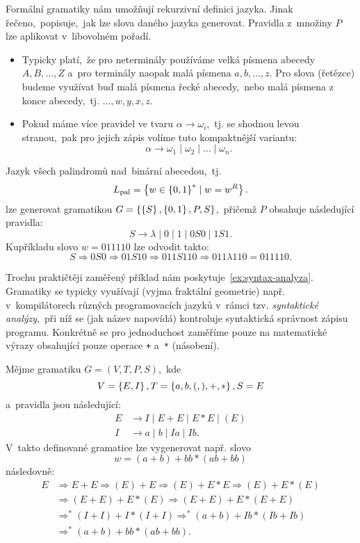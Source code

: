 Formální gramatiky nám umožňují rekurzivní definici jazyka. Jinak řečeno,~popisuje,~jak lze slova daného jazyka generovat. Pravidla z~množiny $P$ lze aplikovat v~libovolném pořadí.
\begin{remark}
    \begin{itemize}
        \item Typicky platí,~že pro neterminály používáme velká písmena abecedy $A,B,\ldots,Z$ a~pro terminály naopak malá písmena $a,b,\ldots,z$. Pro slova (řetězce) budeme využívat buď malá písmena řecké abecedy,~nebo malá písmena z konce abecedy,~tj. $\dots,w,y,x,z$.
        \item Pokud máme více pravidel ve tvaru $\alpha\to\omega_i$,~tj. se shodnou levou stranou,~pak pro jejich zápis volíme tuto kompaktnější variantu:
        \[\alpha\to\omega_1\mid\omega_2\mid\dots\mid\omega_n.\]
    \end{itemize}
\end{remark}
\begin{example}
    Jazyk všech palindromů nad~binární abecedou,~tj.
    \[L_\text{pal}=\left\{w\in\left\{0,1\right\}^*\mid w=w^R\right\}.\]
    lze generovat gramatikou $G=\left\{\left\{S\right\},\left\{0,1\right\},P,S\right\}$,~přičemž $P$ obsahuje následující pravidla:
    \[S\to\lambda\mid 0\mid 1\mid 0S0\mid 1S1.\]
    Kupříkladu slovo $w=011110$ lze odvodit takto:
    \[S\Rightarrow 0S0\Rightarrow 01S10\Rightarrow011S110\Rightarrow011\lambda 110=011110.\]
\end{example}
Trochu praktičtěji zaměřený příklad nám poskytuje~\ref{ex:syntax-analyza}. Gramatiky se typicky využívají (vyjma fraktální geometrie) např. v~kompilátorech různých programovacích jazyků v~rámci tzv. \emph{syntaktické analýzy},~při níž se (jak název napovídá) kontroluje syntaktická správnost zápisu programu. Konkrétně se pro jednoduchost zaměříme pouze na matematické výrazy obsahující pouze operace \texttt{+} a~\texttt{*} (násobení).
\begin{example}\label{ex:syntax-analyza}
    Mějme gramatiku $G=(V,T,P,S)$,~kde
    \[V=\left\{E,I\right\},T=\left\{a,b,(,),+,*\right\},S=E\]
    a~pravidla jsou následující:
    \begin{align*}
        E&\to I\mid E+E\mid E*E\mid (E)\\
        I&\to a\mid b\mid Ia\mid Ib.
    \end{align*}
    V~takto definované gramatice lze vygenerovat např. slovo
    \[w=(a+b)+bb*(ab+bb)\]
    následovně:
    \begin{align*}
        E&\Rightarrow E+E\Rightarrow(E)+E\Rightarrow(E)+E*E\Rightarrow(E)+E*(E)\\
        &\Rightarrow(E+E)+E*(E)\Rightarrow(E+E)+E*(E+E)\\
        &\Rightarrow^*(I+I)+I*(I+I)\Rightarrow^*(a+b)+Ib*(Ib+Ib)\\
        &\Rightarrow^*(a+b)+bb*(ab+bb).
    \end{align*}
\end{example}
